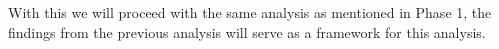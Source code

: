 With this we will proceed with the same analysis as mentioned in Phase 1, the findings from the previous analysis will serve as a framework for this analysis.

 











